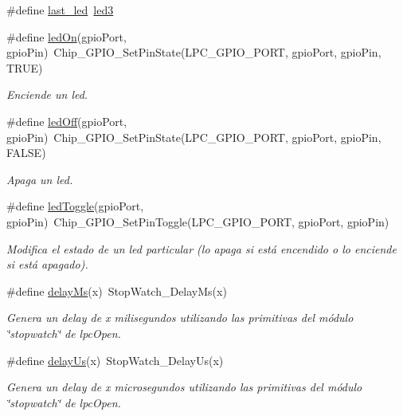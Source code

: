 \begin{DoxyCompactItemize}
\item 
\#define \hyperlink{group__hardware_ga6d4d3ee57587d8e08816b804150c29f8}{last\+\_\+led}~\hyperlink{group__hardware_gga2a000bf02da2abba53355f3fcfdb2d0ba16d63d90ec9dc8c27019e7c28ff1cfc0}{led3}
\item 
\#define \hyperlink{group__hardware_ga00c30099ff3ceab3e94a516833c11c98}{led\+On}(gpio\+Port,  gpio\+Pin)~Chip\+\_\+\+G\+P\+I\+O\+\_\+\+Set\+Pin\+State(L\+P\+C\+\_\+\+G\+P\+I\+O\+\_\+\+P\+O\+RT, gpio\+Port, gpio\+Pin, T\+R\+UE)
\begin{DoxyCompactList}\small\item\em Enciende un led. \end{DoxyCompactList}\item 
\#define \hyperlink{group__hardware_gac51bfbb3d5136e9e0479f3d8e6bb14de}{led\+Off}(gpio\+Port,  gpio\+Pin)~Chip\+\_\+\+G\+P\+I\+O\+\_\+\+Set\+Pin\+State(L\+P\+C\+\_\+\+G\+P\+I\+O\+\_\+\+P\+O\+RT, gpio\+Port, gpio\+Pin, F\+A\+L\+SE)
\begin{DoxyCompactList}\small\item\em Apaga un led. \end{DoxyCompactList}\item 
\#define \hyperlink{group__hardware_gaafb30c58d318e90ed902cb1aef013286}{led\+Toggle}(gpio\+Port,  gpio\+Pin)~Chip\+\_\+\+G\+P\+I\+O\+\_\+\+Set\+Pin\+Toggle(L\+P\+C\+\_\+\+G\+P\+I\+O\+\_\+\+P\+O\+RT, gpio\+Port, gpio\+Pin)
\begin{DoxyCompactList}\small\item\em Modifica el estado de un led particular (lo apaga si está encendido o lo enciende si está apagado). \end{DoxyCompactList}\item 
\#define \hyperlink{group__hardware_gafdd074f68e5ae5b133575140014f918d}{delay\+Ms}(x)~Stop\+Watch\+\_\+\+Delay\+Ms(x)
\begin{DoxyCompactList}\small\item\em Genera un delay de x milisegundos utilizando las primitivas del módulo \char`\"{}stopwatch\char`\"{} de lpc\+Open. \end{DoxyCompactList}\item 
\#define \hyperlink{group__hardware_ga1d13abaa815195d73e9dc2676e6fba5b}{delay\+Us}(x)~Stop\+Watch\+\_\+\+Delay\+Us(x)
\begin{DoxyCompactList}\small\item\em Genera un delay de x microsegundos utilizando las primitivas del módulo \char`\"{}stopwatch\char`\"{} de lpc\+Open. \end{DoxyCompactList}\end{DoxyCompactItemize}
